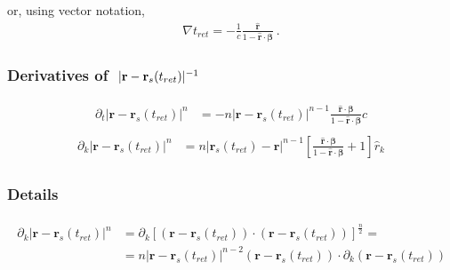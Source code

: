 \documentclass[letterpaper,10pt,english]{jupyterBook}
\begin{document}
\sphinxAtStartPar
or, using vector notation,
\begin{equation*}
\begin{split}\nabla t_{ret} = - \frac{1}{c} \frac{\hat{\mathbf{r}}}{1 - \hat{\mathbf{r}} \cdot \boldsymbol\beta}  \ .\end{split}
\end{equation*}\subsubsection*{Derivatives of \protect\(\ |\mathbf{r} - \mathbf{r}_s(t_{ret})|^{-1}\protect\)}
\begin{equation*}
\begin{split}\begin{aligned}
  \partial_t | \mathbf{r} - \mathbf{r}_s(t_{ret}) |^n
  & = - n | \mathbf{r} - \mathbf{r}_s(t_{ret}) |^{n-1} \frac{  \hat{\mathbf{r}} \cdot \boldsymbol\beta }{1 - \hat{\mathbf{r}} \cdot \boldsymbol\beta}c  
\end{aligned}\end{split}
\end{equation*}\begin{equation*}
\begin{split}\begin{aligned}
  \partial_k | \mathbf{r} - \mathbf{r}_s(t_{ret}) |^n
  & = n | \mathbf{r}_s(t_{ret}) - \mathbf{r} |^{n-1} \left[ \frac{  \hat{\mathbf{r}} \cdot \boldsymbol\beta }{1 - \hat{\mathbf{r}} \cdot \boldsymbol\beta} + 1 \right] \hat{r}_k
\end{aligned}\end{split}
\end{equation*}\subsubsection*{Details}
\begin{equation*}
\begin{split}\begin{aligned}
  \partial_k | \mathbf{r} - \mathbf{r}_s(t_{ret}) |^n
  & = \partial_k \left[ ( \mathbf{r} - \mathbf{r}_s(t_{ret}) ) \cdot ( \mathbf{r} - \mathbf{r}_s(t_{ret}) ) \right]^{\frac{n}{2}} = \\
  & = n  | \mathbf{r} - \mathbf{r}_s(t_{ret}) |^{n-2} ( \mathbf{r} - \mathbf{r}_s(t_{ret}) ) \cdot \partial_k ( \mathbf{r} - \mathbf{r}_s(t_{ret}) )
\end{aligned}\end{split}
\end{equation*}
\end{document}

